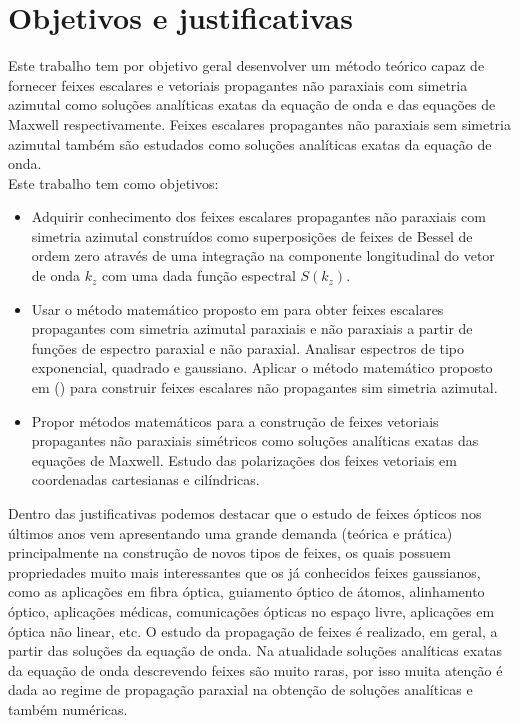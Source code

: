 \section{Objetivos e justificativas}
Este trabalho tem por objetivo geral desenvolver um método teórico capaz de fornecer feixes escalares e vetoriais propagantes não paraxiais com simetria azimutal como soluções analíticas exatas da equação de onda e das equações de Maxwell respectivamente. Feixes escalares propagantes não paraxiais sem simetria azimutal também são estudados como soluções analíticas exatas da equação de onda.\\
Este trabalho tem como objetivos:
\begin{itemize}
\item Adquirir conhecimento dos feixes escalares propagantes não paraxiais com simetria azimutal construídos como superposições de feixes de Bessel de ordem zero através de uma integração na componente longitudinal do vetor de onda $k_z$ com uma dada função espectral $S(k_z)$.
\item Usar o método matemático proposto em \cite{Lya:2} para obter feixes escalares propagantes com simetria azimutal paraxiais e não paraxiais a partir de funções de espectro paraxial e não paraxial. Analisar espectros de tipo exponencial, quadrado e gaussiano. Aplicar o método matemático proposto em (\cite{Lya:2}) para construir feixes escalares não propagantes sim simetria azimutal. 
\item Propor métodos matemáticos para a construção de feixes vetoriais propagantes não paraxiais simétricos como soluções analíticas exatas das equações de Maxwell. Estudo das polarizações dos feixes vetoriais em coordenadas cartesianas e cilíndricas.
\end{itemize}  
Dentro das justificativas podemos destacar que o estudo de feixes ópticos nos últimos anos vem apresentando uma grande demanda (teórica e prática) principalmente na construção de novos tipos de feixes, os quais possuem propriedades muito mais interessantes que os já conhecidos feixes gaussianos, como as aplicações em fibra óptica, guiamento óptico de átomos, alinhamento óptico, aplicações médicas, comunicações ópticas no espaço livre, aplicações em óptica não linear, etc. O estudo da propagação de feixes é realizado, em geral, a partir das soluções da equação de onda. Na atualidade soluções analíticas exatas da equação de onda descrevendo feixes são muito raras, por isso muita atenção é dada ao regime de propagação paraxial na obtenção de soluções analíticas e também numéricas.\\
